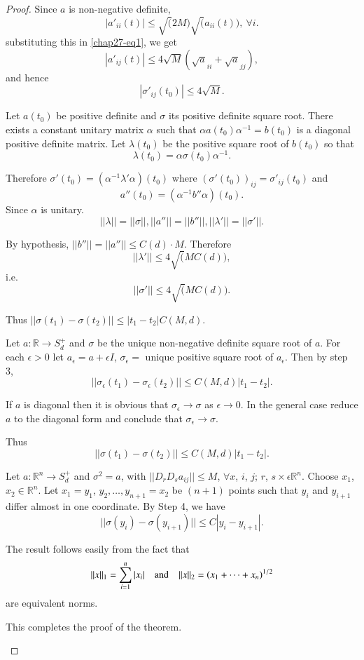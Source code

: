 \begin{proof}
Since $a$ is non-negative definite,
$$
|a'_{ii}(t)|\leq \surd (2M)\surd (a_{ii}(t)),\ \forall i.
$$\pageoriginale
substituting this in \eqref{chap27-eq1}, we get
$$
|a'_{ij}(t)|\leq 4\surd M(\surd a_{ii}+\surd a_{jj}),
$$
and hence
$$
|\sigma'_{ij}(t_{0})|\leq 4\surd M.
$$

\begin{step}%
Let $a(t_{0})$ be positive definite and $\sigma$ its positive definite
square root. There exists a constant unitary matrix $\alpha$ such that
$\alpha a(t_0)\alpha^{-1}=b(t_{0})$ is a diagonal positive definite
matrix. Let $\lambda(t_{0})$ be the positive square root of $b(t_{0})$
so that
$$
\lambda(t_{0})=\alpha \sigma(t_{0})\alpha^{-1}.
$$

Therefore $\sigma'(t_{0})=(\alpha^{-1}\lambda'\alpha)(t_{0})$ where
$(\sigma'(t_{0}))_{ij}=\sigma'_{ij}(t_{0})$ and
$$
a''(t_{0})=(\alpha^{-1}b''\alpha)(t_{0}).
$$ 
Since $\alpha$ is unitary.
$$
||\lambda ||=||\sigma||,||a''||=||b''||,||\lambda'||=||\sigma'||.
$$

By hypothesis, $||b''||=||a''||\leq C(d)\cdot M$. Therefore
$$
||\lambda'||\leq 4\surd (MC(d)),
$$ 
i.e.\@ 
$$
||\sigma'||\leq 4\surd (MC(d)).
$$ 

Thus $||\sigma(t_{1})-\sigma(t_{2})||\leq |t_{1}-t_{2}|C(M,d)$.
\end{step}

\begin{step}%
Let $a:\mathbb{R}\to S^{+}_{d}$ and $\sigma$ be the unique
non-negative definite square root of $a$. For each $\epsilon>0$ let
$a_{\epsilon}=a+\epsilon I$, $\sigma_{\epsilon}=$ unique positive
square root of $a_{\epsilon}$. Then by step 3,
$$
||\sigma_{\epsilon}(t_{1})-\sigma_{\epsilon}(t_{2})||\leq
C(M,d)|t_{1}-t_{2}|.
$$

If $a$ is diagonal then it is obvious that $\sigma_{\epsilon}\to
\sigma$ as $\epsilon\to 0$. In the general case reduce $a$ to the
diagonal form and conclude that $\sigma_{\epsilon}\to \sigma$.

Thus\pageoriginale
$$
||\sigma(t_{1})-\sigma(t_{2})||\leq C(M,d)|t_{1}-t_{2}|.
$$
\end{step}

\begin{step}%
Let $a:\mathbb{R}^{n}\to S^{+}_{d}$ and $\sigma^{2}=a$, with
$||D_{r}D_{s}a_{ij}||\leq M$, $\forall x$, $i$, $j$; $r$, $s\times
\epsilon \mathbb{R}^{n}$. Choose $x_{1}$, $x_{2}\in
\mathbb{R}^{n}$. Let $x_{1}=y_{1}$, $y_{2},\ldots,y_{n+1}=x_{2}$ be
$(n+1)$ points such that $y_{i}$ and $y_{i+1}$ differ almost in one
coordinate. By Step 4, we have
\begin{equation*}
||\sigma(y_{i})-\sigma(y_{i+1})||\leq C|y_{i}-y_{i+1}|.\tag{*}
\end{equation*}

The result follows easily from the fact that
$$
||x||_{1}=\sum\limits^{n}_{i=1}|x_{i}|\quad\text{and}\quad
||x||_{2}=(x_{1}+\cdots+x_{n})^{1/2} 
$$
are equivalent norms.

This completes the proof of the theorem.
\end{step}




\end{proof}




